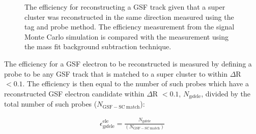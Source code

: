 \documentclass{cmspaper}
\begin{document}
\begin{figure}[htb]
  \begin{center}
    \caption{The efficiency for reconstructing a GSF track given that a super cluster was reconstructed in the same direction measured using the tag and probe method. The efficiency measurement from the signal Monte Carlo simulation is compared with the measurement using the mass fit background subtraction technique.}
    \label{gsfTrackEfficiency_TagAndProbe}
  \end{center}
\end{figure}


The efficiency for a GSF electron to be reconstructed is measured by defining a probe to be any GSF track that is matched to a super cluster to within $\Delta$R $< 0.1$. The efficiency is then equal to the number of such probes which have a reconstructed GSF electron candidate within $\Delta$R $< 0.1$, $N_{\mathrm{gsfele}}$, divided by the total number of such probes ($N_{\mathrm{GSF-SC\ match}}$):

\begin{eqnarray}
  \label{eqn:gsfeleEfficiency}  
  \epsilon_{\mathrm{gsfele}}^{\mathrm{ele}} = \frac{N_{\mathrm{gsfele}}}{(N_{\mathrm{GSF-SC\ match}})}
\end{eqnarray}
\end{document}
